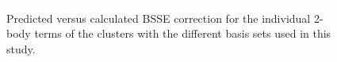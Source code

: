\documentclass[11pt, proquest]{uwthesis}[2020/02/24]
\begin{document}
\begin{figure}[t]
\uwsinglespace
\begin{center}
\includegraphics[width=\textwidth]{Figures/Chapter_2/2body_bsse_correlation.pdf}
\end{center}
\label{fig:MBE_I_F10}
\caption[temp]{Predicted versus calculated BSSE correction for the individual 2-body terms of the clusters with the different basis sets used in this study.}
\end{figure}
\end{document}
